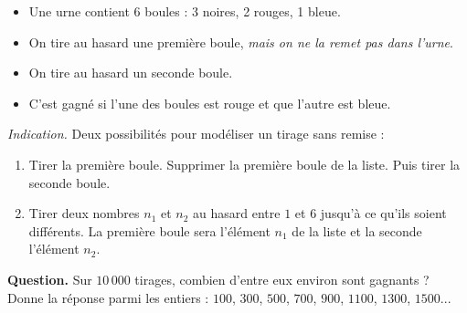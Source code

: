 \documentclass[class=report,crop=false, 12pt]{standalone}
\begin{document}
\begin{enigme}

\sauteligne

\begin{itemize}
  \item Une urne contient $6$ boules : 3 noires, 2 rouges, 1 bleue.
  \item On tire au hasard une première boule, \emph{mais on ne la remet pas dans l'urne}.
  \item On tire au hasard un seconde boule.
  \item C'est gagné si l'une des boules est rouge et que l'autre est bleue.
\end{itemize}

\bigskip

\emph{Indication.} Deux possibilités pour modéliser un tirage sans remise : 
\begin{enumerate}
  \item Tirer la première boule. Supprimer la première boule de la liste. Puis tirer la seconde boule.
  
  \item Tirer deux nombres $n_1$ et $n_2$ au hasard entre $1$ et $6$ jusqu'à ce qu'ils soient différents. La première boule sera l'élément $n_1$ de la liste et la seconde l'élément $n_2$.
\end{enumerate}
  

\bigskip

\textbf{Question.} Sur $10\,000$ tirages, combien d'entre eux environ sont gagnants ?
Donne la réponse parmi les entiers :
$100$, $300$, $500$, $700$, $900$, $1100$, $1300$, $1500$...



\end{enigme}
\end{document}
